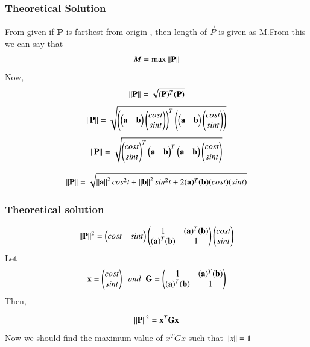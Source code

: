 \documentclass{beamer}
\begin{document}
\begin{frame}
\frametitle{Theoretical Solution}
From given if \textbf{P} is farthest from origin , then length of $\vec{P}$ is given as M.From this we can say  that
\begin{align}
   M=\text{max}\norm{\Vec{P}}
\end{align}
Now,
\begin{align}
    \norm{\Vec{P}}=\sqrt{(\Vec{P})^T(\Vec{P})}
\end{align}
\begin{align}
    \norm{\Vec{P}}=\sqrt{\brak{\myvec{\vec{a}&\vec{b}}\myvec{cost\\sint}}^T\brak{\myvec{\vec{a}&\vec{b}}\myvec{cost\\sint}}}
\end{align}
\begin{align}
    \norm{\Vec{P}}=\sqrt{\myvec{cost\\sint}^T\myvec{\vec{a}&\vec{b}}
    ^T\myvec{\vec{a}&\vec{b}}\myvec{cost\\sint}}
\end{align}

\begin{align}
   \norm{\Vec{P}}=\sqrt{\norm{\Vec{a}}^2cos^2t+ \norm{\Vec{b}}^2sin^2t+2(\Vec{a})^T(\Vec{b})(cost)(sint)}
\end{align}



\end{frame}
\begin{frame}
\frametitle{Theoretical solution}
\begin{align}
       \norm{\Vec{P}}^2=\myvec{cost & sint}\myvec{1&(\Vec{a})^T(\Vec{b})\\(\Vec{a})^T(\Vec{b})&1}\myvec{cost\\sint}
\end{align}
Let
\begin{align}
    \Vec{x}= \myvec{cost \\ sint} \;\;and\;\;\vec{G}=\myvec{1&(\Vec{a})^T(\Vec{b})\\(\Vec{a})^T(\Vec{b})&1}
\end{align}
Then, 

\begin{align}
\norm{\Vec{P}}^2=\Vec{x}^T\vec{G}\Vec{x}
  \end{align}
Now we should find the maximum value of \textbf{$x^TGx$} such that $\left\lVert x\right\rVert=1$\\


\end{frame}
\end{document}
